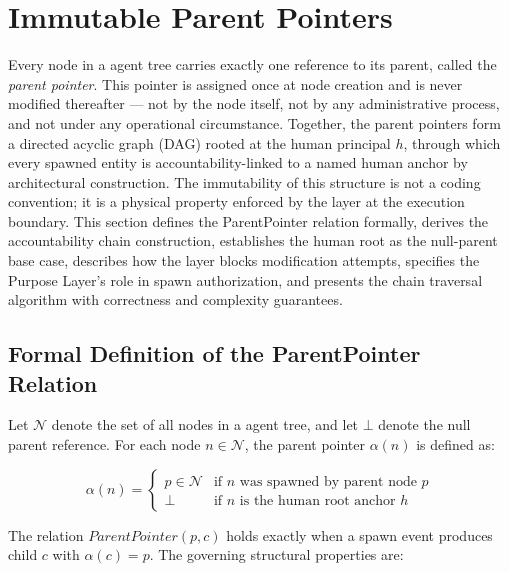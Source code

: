 \section{Immutable Parent Pointers}
\label{sec:immutable-parent-pointers}

Every node in a \bxthree{} agent tree carries exactly one reference to its parent, called the \emph{parent pointer}. This pointer is assigned once at node creation and is never modified thereafter — not by the node itself, not by any administrative process, and not under any operational circumstance. Together, the parent pointers form a directed acyclic graph (DAG) rooted at the human principal $h$, through which every spawned entity is accountability-linked to a named human anchor by architectural construction. The immutability of this structure is not a coding convention; it is a physical property enforced by the \fact{} layer at the execution boundary. This section defines the ParentPointer relation formally, derives the accountability chain construction, establishes the human root as the null-parent base case, describes how the \fact{} layer blocks modification attempts, specifies the Purpose Layer's role in spawn authorization, and presents the chain traversal algorithm with correctness and complexity guarantees.

\subsection{Formal Definition of the ParentPointer Relation}

Let $\mathcal{N}$ denote the set of all nodes in a \bxthree{} agent tree, and let $\bot$ denote the null parent reference. For each node $n \in \mathcal{N}$, the parent pointer $\alpha(n)$ is defined as:

\begin{equation}
\alpha(n) =
\begin{cases}
p \in \mathcal{N} & \text{if } n \text{ was spawned by parent node } p \\[6pt]
\bot              & \text{if } n \text{ is the human root anchor } h
\end{cases}
\tag{PP-1}
\end{equation}

The relation $\textit{ParentPointer}(p, c)$ holds exactly when a spawn event produces child $c$ with $\alpha(c) = p$. The governing structural properties are:


